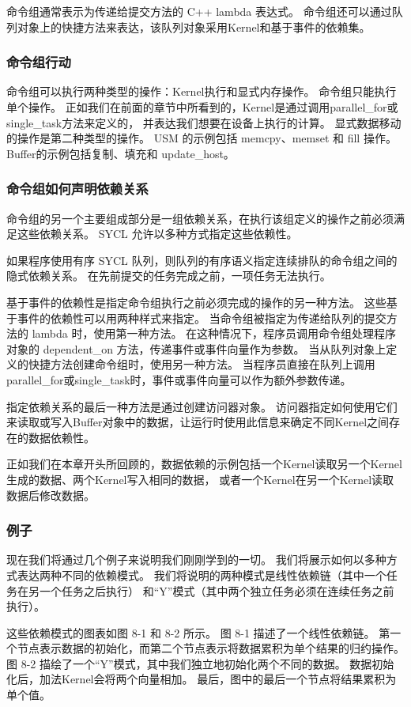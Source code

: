 命令组通常表示为传递给提交方法的 C++ lambda 表达式。 
命令组还可以通过队列对象上的快捷方法来表达，该队列对象采用Kernel和基于事件的依赖集。

\subsubsection{命令组行动}
命令组可以执行两种类型的操作：Kernel执行和显式内存操作。 命令组只能执行单个操作。 
正如我们在前面的章节中所看到的，Kernel是通过调用parallel\_for或single\_task方法来定义的，
并表达我们想要在设备上执行的计算。 显式数据移动的操作是第二种类型的操作。 
USM 的示例包括 memcpy、memset 和 fill 操作。 Buffer的示例包括复制、填充和 update\_host。

\subsubsection{命令组如何声明依赖关系}
命令组的另一个主要组成部分是一组依赖关系，在执行该组定义的操作之前必须满足这些依赖关系。 
SYCL 允许以多种方式指定这些依赖性。

如果程序使用有序 SYCL 队列，则队列的有序语义指定连续排队的命令组之间的隐式依赖关系。 
在先前提交的任务完成之前，一项任务无法执行。

基于事件的依赖性是指定命令组执行之前必须完成的操作的另一种方法。 这些基于事件的依赖性可以用两种样式来指定。 
当命令组被指定为传递给队列的提交方法的 lambda 时，使用第一种方法。 
在这种情况下，程序员调用命令组处理程序对象的 dependent\_on 方法，传递事件或事件向量作为参数。 
当从队列对象上定义的快捷方法创建命令组时，使用另一种方法。 
当程序员直接在队列上调用parallel\_for或single\_task时，事件或事件向量可以作为额外参数传递。

指定依赖关系的最后一种方法是通过创建访问器对象。 
访问器指定如何使用它们来读取或写入Buffer对象中的数据，让运行时使用此信息来确定不同Kernel之间存在的数据依赖性。

正如我们在本章开头所回顾的，数据依赖的示例包括一个Kernel读取另一个Kernel生成的数据、两个Kernel写入相同的数据，
或者一个Kernel在另一个Kernel读取数据后修改数据。

\subsubsection{例子}
现在我们将通过几个例子来说明我们刚刚学到的一切。 我们将展示如何以多种方式表达两种不同的依赖模式。 
我们将说明的两种模式是线性依赖链（其中一个任务在另一个任务之后执行）
和“Y”模式（其中两个独立任务必须在连续任务之前执行）。

这些依赖模式的图表如图 8-1 和 8-2 所示。 图 8-1 描述了一个线性依赖链。 
第一个节点表示数据的初始化，而第二个节点表示将数据累积为单个结果的归约操作。 
图 8-2 描绘了一个“Y”模式，其中我们独立地初始化两个不同的数据。 数据初始化后，加法Kernel会将两个向量相加。 
最后，图中的最后一个节点将结果累积为单个值。


